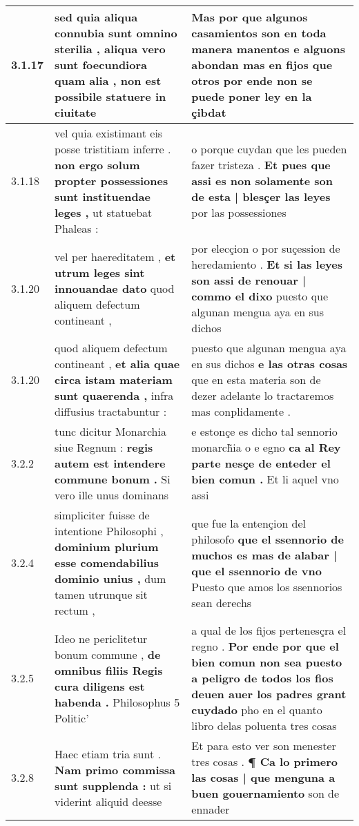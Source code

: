 \begin{tabular}{|p{1cm}|p{6.5cm}|p{6.5cm}|}
3.1.17 & sed quia aliqua connubia sunt omnino sterilia , \textbf{ aliqua vero sunt foecundiora quam alia , } non est possibile statuere in ciuitate & Mas por que algunos casamientos son en toda manera manentos \textbf{ e alguons abondan mas en fijos } que otros por ende non se puede poner ley en la çibdat \\\hline
3.1.18 & vel quia existimant eis posse tristitiam inferre . \textbf{ non ergo solum propter possessiones sunt instituendae leges , } ut statuebat Phaleas : & o porque cuydan que les pueden fazer tristeza . \textbf{ Et pues que assi es non solamente son de esta | blesçer las leyes } por las possessiones \\\hline
3.1.20 & vel per haereditatem , \textbf{ et utrum leges sint innouandae dato } quod aliquem defectum contineant , & por elecçion o por suçession de heredamiento . \textbf{ Et si las leyes son assi de renouar | commo el dixo } puesto que algunan mengua aya en sus dichos \\\hline
3.1.20 & quod aliquem defectum contineant , \textbf{ et alia quae circa istam materiam sunt quaerenda , } infra diffusius tractabuntur : & puesto que algunan mengua aya en sus dichos \textbf{ e las otras cosas } que en esta materia son de dezer adelante lo tractaremos mas conplidamente . \\\hline
3.2.2 & tunc dicitur Monarchia siue Regnum : \textbf{ regis autem est intendere commune bonum . } Si vero ille unus dominans & e estonçe es dicho tal sennorio monarch̃ia o e egno \textbf{ ca al Rey parte nesçe de enteder el bien comun . } Et li aquel vno assi \\\hline
3.2.4 & simpliciter fuisse de intentione Philosophi , \textbf{ dominium plurium esse comendabilius dominio unius , } dum tamen utrunque sit rectum , & que fue la entençion del philosofo \textbf{ que el ssennorio de muchos es mas de alabar | que el ssennorio de vno } Puesto que amos los ssennorios sean derechs \\\hline
3.2.5 & Ideo ne periclitetur bonum commune , \textbf{ de omnibus filiis Regis cura diligens est habenda . } Philosophus 5 Politic’ & a qual de los fijos pertenesçra el regno . \textbf{ Por ende por que el bien comun non sea puesto a peligro de todos los fios deuen auer los padres grant cuydado } pho en el quanto libro delas poluenta tres cosas \\\hline
3.2.8 & Haec etiam tria sunt . \textbf{ Nam primo commissa sunt supplenda : } ut si viderint aliquid deesse & Et para esto ver son menester tres cosas . \textbf{ ¶ Ca lo primero las cosas | que menguna a buen gouernamiento } son de ennader \\\hline

\end{tabular}
